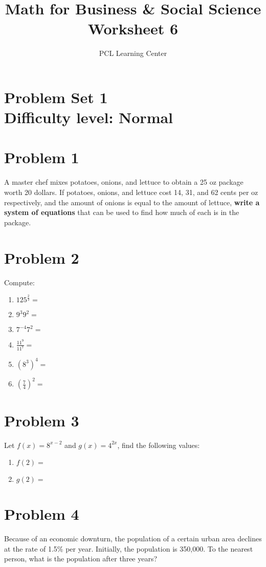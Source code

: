 \documentclass[12pt]{article}
\title{Math for Business \& Social Science\\ Worksheet 6}
\author{PCL Learning Center}
\date{}
\begin{document}
\maketitle

\section*{Problem Set 1\\Difficulty level: Normal}

\section*{Problem 1}
A master chef mixes potatoes, onions, and lettuce to obtain a 25 oz package worth 20 dollars. If potatoes, onions, and lettuce cost 14, 31, and 62 cents per oz respectively, and the amount of onions is equal to the amount of lettuce, \textbf{write a system of equations} that can be used to find how much of each is in the package.

\section*{Problem 2}
Compute:
\begin{enumerate}[label=(\alph*)]
    \item \( 125^{\frac{2}{3}} = \)
    \item \( 9^3 9^2 = \)
    \item \( 7^{-4} 7^2 = \)
    \item \( \frac{11^9}{11^7} = \)
    \item \( \left(8^3\right)^4 = \)
    \item \( \left(\frac{7}{4}\right)^2 = \)
\end{enumerate}

\section*{Problem 3}
Let \( f(x) = 8^{x-2} \) and \( g(x) = 4^{2x} \), find the following values:
\begin{enumerate}[label=(\alph*)]
    \item \( f(2) = \)
    \item \( g(2) = \)
\end{enumerate}

\section*{Problem 4}
Because of an economic downturn, the population of a certain urban area declines at the rate of 1.5\% per year. Initially, the population is 350{,}000. To the nearest person, what is the population after three years?
\end{document}
